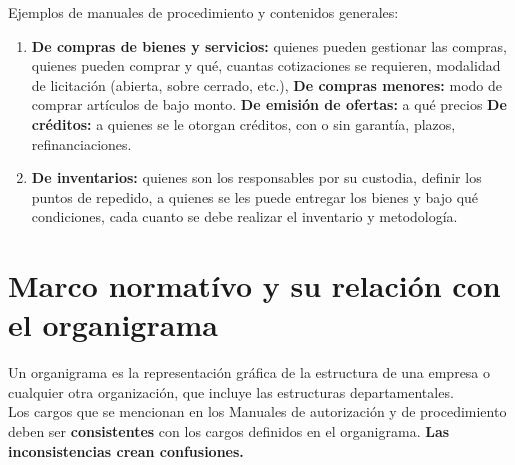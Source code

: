 \documentclass[12pt]{book}
\begin{document}
Ejemplos de manuales de procedimiento y contenidos generales:
\begin{enumerate}
	\item		\textbf{De compras de bienes y servicios:} quienes pueden gestionar las compras, quienes pueden comprar y qué,
		cuantas cotizaciones se requieren, modalidad de licitación (abierta, sobre cerrado, etc.),
		\textbf{De compras menores:} modo de comprar artículos de bajo monto.
		\textbf{De emisión de ofertas:} a qué precios
		\textbf{De créditos:} a quienes se le otorgan créditos, con o sin garantía, plazos, refinanciaciones.
	\item	\textbf{De inventarios:} quienes son los responsables por su custodia, definir los puntos de repedido, a quienes se
		les puede entregar los bienes y bajo qué condiciones, cada cuanto se debe realizar el inventario y
		metodología.
\end{enumerate}

\section{Marco normatívo y su relación con el organigrama}
Un organigrama es la representación gráfica de la estructura de una empresa o cualquier otra organización, que incluye
las estructuras departamentales.\\
Los cargos que se mencionan en los Manuales de autorización y de procedimiento deben ser \textbf{consistentes} con los cargos
definidos en el organigrama.  \textbf{Las inconsistencias crean confusiones.}
\end{document}
